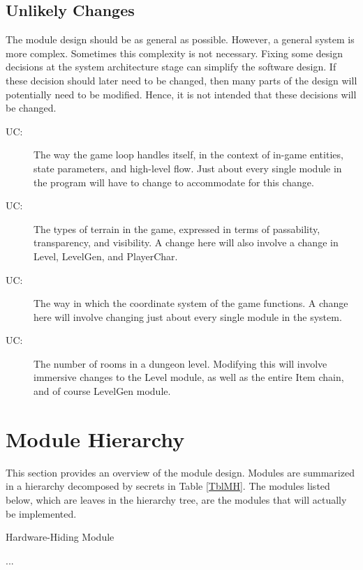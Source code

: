 \documentclass[12pt, titlepage]{article}
\newcommand{\newSection}[1]{
  \newpage
  \section{#1}
}
\newcounter{ucnum}
\newcommand{\uctheucnum}{UC\theucnum}
\newcounter{mnum}
\newcommand{\mthemnum}{M\themnum}
\begin{document}
	\subsection{Unlikely Changes} \label{SecUchange}

		The module design should be as general as possible. However, a general system is more complex. Sometimes this complexity is not necessary. Fixing some design decisions at the system architecture stage can simplify the software design. If these decision should later need to be changed, then many parts of the design	will potentially need to be modified. Hence, it is not intended that these decisions will be changed.

		\bigskip\begin{description}
			\item[ \uctheucnum \label{ucMasterCtrl}:] The way the game loop handles itself, in the context of in-game entities, state parameters, and high-level flow. Just about every single module in the program will have to change to accommodate for this change.
			\item[ \uctheucnum \label{ucTerrain}:] The types of terrain in the game, expressed in terms of passability, transparency, and visibility. A change here will also involve a change in Level, LevelGen, and PlayerChar.
			\item[ \uctheucnum \label{ucCoord}:] The way in which the coordinate system of the game functions. A change here will involve changing just about every single module in the system.
			\item[ \uctheucnum \label{ucRooms}:] The number of rooms in a dungeon level. Modifying this will involve immersive changes to the Level module, as well as the entire Item chain, and of course LevelGen module.
		\end{description}

\newSection{Module Hierarchy} \label{SecMH}

	This section provides an overview of the module design. Modules are summarized in a hierarchy decomposed by secrets in Table \ref{TblMH}. The modules listed below, which are leaves in the hierarchy tree, are the modules that will actually be implemented.

	\bigskip\begin{description}
	\item [ \mthemnum \label{mHH}:] Hardware-Hiding Module
	\item ...
	\end{description}
\end{document}
